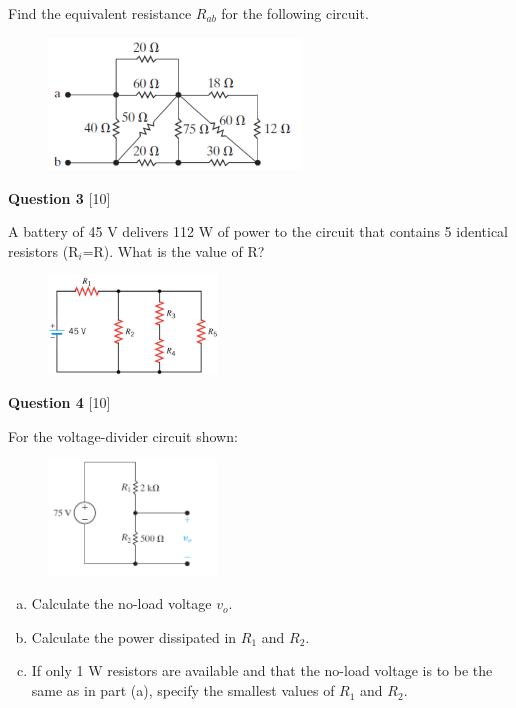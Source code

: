 \documentclass[12pt]{article}
\begin{document}
Find the equivalent resistance $R_{ab}$ for the following circuit.
\begin{figure}[h!]
     \centering
\vspace{-0.1in}
     \includegraphics[clip,width=0.6\textwidth]{Fig3-6d.png}
\vspace{-0.15in}
\end{figure}
 \newpage
\noindent
{\bf Question 3} [10] %

A battery of 45 V delivers 112 W of power to the circuit that contains 5 identical resistors (R$_{i}$=R). What is the value of R?

\begin{figure}[!h]
  \centering 
  \includegraphics[clip,width=0.4\textwidth]{Fig-Q3.png}
\end{figure}

\vspace{0.1in}
\noindent
{\bf Question 4} [10] %

For the voltage-divider circuit shown: 
\begin{figure}[h!]
  \centering 
  \includegraphics[clip,width=0.4\textwidth]{Fig3-13.png}
\end{figure}

\begin{enumerate}[(a)]
\item Calculate the no-load voltage $v_{o}$.
\item Calculate the power dissipated in $R_{1}$ and $R_{2}$.
\item If only 1 W resistors are available and that the no-load voltage is to be the same as in part (a), specify the smallest values of $R_{1}$ and $R_{2}$.
\end{enumerate}
\end{document}
